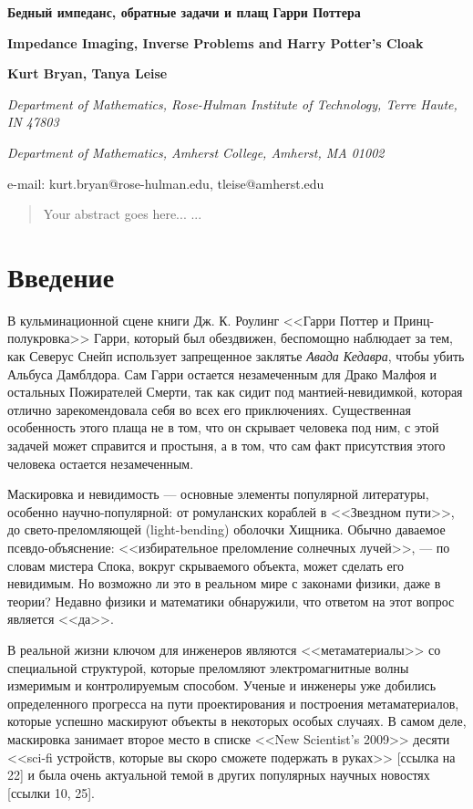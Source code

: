 \documentclass[a4paper, 12pt]{article}
\newcommand{\tit}[1]{\begin{center}{\bf{\Large #1}}\end{center}}
\newcommand{\aut}[1]{\centerline{{\bf #1}}}
\newcommand{\cityorg}[1]{\centerline{\it #1}}
\newcommand{\email}[1]{\centerline{{\small e-mail: #1}}\vspace{\baselineskip}}
\begin{document}
\sloppy

 \tit{Бедный импеданс, обратные задачи и плащ Гарри Поттера}
 \tit{Impedance Imaging,
Inverse Problems
and Harry Potter’s Cloak}
 \aut{Kurt Bryan, Tanya Leise}
 \cityorg{Department of Mathematics, Rose-Hulman Institute of Technology, Terre Haute, IN 47803}
  \cityorg{Department of Mathematics, Amherst College, Amherst, MA 01002}
 \email{kurt.bryan@rose-hulman.edu, tleise@amherst.edu}

\begin{abstract}
Your abstract goes here...
...
\end{abstract}

\setcounter{secnumdepth}{5}

\section{Введение}
В кульминационной сцене книги Дж. К. Роулинг <<Гарри Поттер и Принц-полукровка>> Гарри, который был обездвижен, беспомощно наблюдает за тем, как Северус Снейп использует запрещенное заклятье \textit{Авада Кедавра}, чтобы убить Альбуса Дамблдора. Сам Гарри остается незамеченным для Драко Малфоя и остальных Пожирателей Смерти, так как сидит под мантией-невидимкой, которая отлично зарекомендовала себя во всех его приключениях. Существенная особенность этого плаща не в том, что он скрывает человека под ним, с этой задачей может справится и простыня, а в том, что сам факт присутствия этого человека остается незамеченным.


Маскировка и невидимость --- основные элементы популярной литературы, особенно научно-популярной: от ромуланских кораблей в <<Звездном пути>>, до свето-преломляющей (light-bending) оболочки Хищника. Обычно даваемое псевдо-объяснение: <<избирательное преломление солнечных лучей>>, --- по словам мистера Спока, вокруг скрываемого объекта, может сделать его невидимым. Но возможно ли это в реальном мире с законами физики, даже в теории? Недавно физики и математики обнаружили, что ответом на этот вопрос является <<да>>.


В реальной жизни ключом для инженеров являются <<метаматериалы>> со специальной структурой, которые преломляют электромагнитные волны измеримым и контролируемым способом. Ученые и инженеры уже добились определенного прогресса на пути проектирования и построения метаматериалов, которые успешно маскируют объекты в некоторых особых случаях. В самом деле, маскировка занимает второе место в списке <<New Scientist's 2009>> десяти <<sci-fi устройств, которые вы скоро сможете подержать в руках>> [ссылка на 22] и была очень актуальной темой в других популярных научных новостях [ссылки 10, 25].
\end{document}
